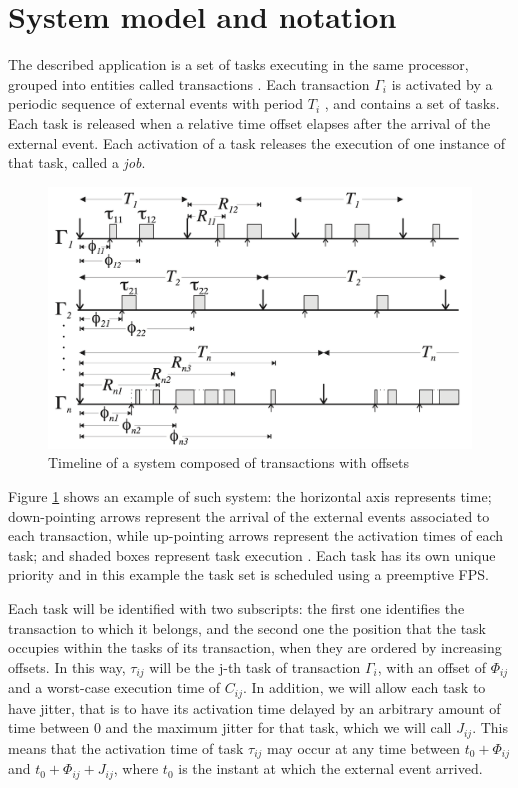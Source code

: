 \documentclass{article}
\begin{document}
\section{System model and notation}\label{model-notation}

The described application is a set of tasks executing in the same processor, grouped into entities called transactions \cite{tindell-offsets}. Each transaction $\Gamma_i$ is activated by a periodic sequence of external events with period $T_i$ , and contains a set of tasks. Each task is released when a relative time offset elapses after the arrival of the external event. Each activation of a task releases the execution of one instance of that task, called a \textit{job}.

\begin{figure}[!htbp]
\centering
\includegraphics[width=5in]{images/transactions}
\caption{Timeline of a system composed of transactions with offsets \cite{pessimistic-rma}}
\label{transactions}
\end{figure}

Figure \ref{transactions} shows an example of such system: the horizontal axis represents time; down-pointing arrows represent the arrival of the external events associated to each transaction, while up-pointing arrows represent the activation times of each task; and shaded boxes represent task execution \cite{pessimistic-rma}. Each task has its own unique priority and in this example the task set is scheduled using a preemptive FPS.

Each task will be identified with two subscripts: the first one identifies the transaction to which it belongs, and the second one the position that the task occupies within the tasks of its transaction, when they are ordered by increasing offsets. In this way, $\tau_{ij}$ will be the j-th task of transaction $\Gamma_i$, with an offset of $\Phi_{ij}$ and a worst-case execution time of $C_{ij}$. In addition, we will allow each task to have jitter, that is to have its activation time delayed by an arbitrary amount of time between 0 and the maximum jitter for that task, which we will call $J_{ij}$. This means that the activation time of task $\tau_{ij}$ may occur at any time between $t_0 + \Phi_{ij}$ and $t_0 + \Phi_{ij} + J_{ij}$, where $t_0$ is the instant at which the external event arrived.
\end{document}
